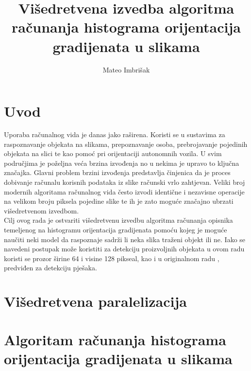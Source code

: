 \documentclass[times, utf8, zavrsni]{fer}
\begin{document}

\title{Višedretvena izvedba algoritma računanja histograma orijentacija gradijenata u slikama}

\author{Mateo Imbrišak}

\maketitle

\zahvala{}

\tableofcontents

\chapter{Uvod}
Uporaba računalnog vida je danas jako raširena. Koristi se u sustavima za raspoznavanje objekata na slikama, prepoznavanje osoba, prebrojavanje pojedinih objekata na slici te kao pomoć pri orijentaciji autonomnih vozila. U svim područjima je poželjna veća brzina izvođenja no u nekima je upravo to ključna značajka. Glavni problem brzini izvođenja predstavlja činjenica da je proces dobivanje računalu korisnih podataka iz slike računski vrlo zahtjevan. Veliki broj modernih algoritama računalnog vida često izvodi identične i nezavisne operacije na velikom broju piksela pojedine slike te ih je zato moguće značajno ubrzati višedretvenom izvedbom. \\

Cilj ovog rada je ostvariti višedretvenu izvedbu algoritma računanja opisnika temeljenog na histogramu orijentacija gradijenata pomoću kojeg je moguće naučiti neki model da raspoznaje sadrži li neka slika traženi objekt ili ne. Iako se navedeni postupak može koristiti za detekciju proizvoljnih objekata u ovom radu koristi se prozor širine 64 i visine 128 pikseal, kao i u originalnom radu \citep{dalalTriggs2005HOG}, predviđen za detekciju pješaka.

\chapter{Višedretvena paralelizacija}

\chapter{Algoritam računanja histograma orijentacija gradijenata u slikama}
\end{document}
